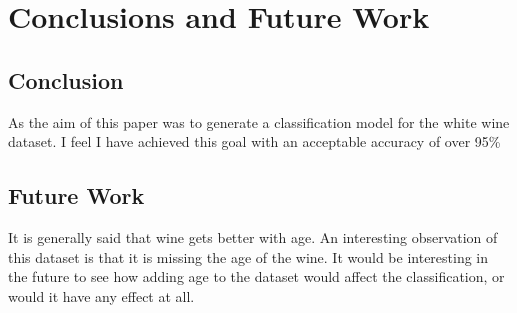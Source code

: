 \section{Conclusions and Future Work}

\subsection{Conclusion}

As the aim of this paper was to generate a classification model for the white wine dataset. I feel I have achieved this goal with an acceptable accuracy of over 95\%

\subsection{Future Work}

It is generally said that wine gets better with age. An interesting observation of this dataset is that it is missing the age of the wine. It would be interesting in the future to see how adding age to the dataset would affect the classification, or would it have any effect at all.



